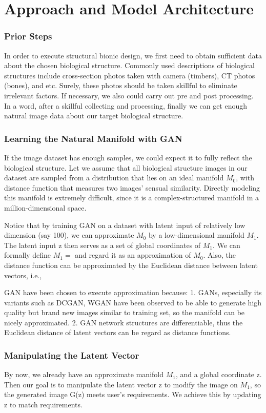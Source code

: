 \chapter{Approach and Model Architecture}

\subsection{Prior Steps}
In order to execute structural bionic design, we first need to obtain sufficient data about the chosen biological structure. Commonly used descriptions of biological structures include cross-section photos taken with camera (timbers), CT photos (bones), and etc. Surely, these photos should be taken skillful to eliminate irrelevant factors. If necessary, we also could carry out pre and post processing. In a word, after a skillful collecting and processing, finally we can get enough natural image data about our target biological structure.

\subsection{Learning the Natural Manifold with GAN}
If the image dataset has enough samples, we could expect it to fully reflect the biological structure. Let we assume that all biological structure images in our dataset are sampled from a distribution that lies on an ideal manifold $M_0$, with distance function that measures two images’ sensual similarity. Directly modeling this manifold is extremely difficult, since it is a complex-structured manifold in a million-dimensional space. 

Notice that by training GAN on a dataset with latent input of relatively low dimension (say 100), we can approximate $M_0$ by a low-dimensional manifold $M_1$. The latent input z then serves as a set of global coordinates of $M_1$. We can formally define $M_1 = {}$ and regard it as an approximation of $M_0$. Also, the distance function can be approximated by the Euclidean distance between latent vectors, i.e., 

GAN have been chosen to execute approximation because: 1. GANs, especially its variants such as DCGAN, WGAN have been observed to be able to generate high quality but brand new images similar to training set, so the manifold can be nicely approximated. 2. GAN network structures are differentiable, thus the Euclidean distance of latent vectors can be regard as distance functions.

\subsection{Manipulating the Latent Vector}
By now, we already have an approximate manifold $M_1$, and a global coordinate z. Then our goal is to manipulate the latent vector z to modify the image on $M_1$, so the generated image G(z) meets user’s requirements. We achieve this by updating z to match requirements.

